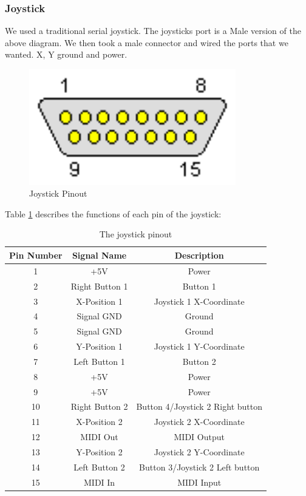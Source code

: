 \subsubsection{Joystick}
We used a traditional serial joystick. The joysticks port is a Male version of the above diagram. We then took a male connector and wired the ports that we wanted. X, Y ground and power. 

\begin{figure}[h]
  \begin{center}
    \includegraphics[width=90mm]{imageSources/joystick.png}
  \end{center}
  \caption{Joystick Pinout} 
  \label{joystick}
\end{figure}

Table \ref{joystickPinout} describes the functions of each pin of the joystick:
\begin{table}
\caption{The joystick pinout}
\begin{center}
\begin{tabular}{ c c c } 
  Pin Number & Signal Name & Description \\
  \hline
 1 & +5V & Power \\
 2 & Right Button 1 & Button 1 \\
 3 & X-Position 1 & Joystick 1 X-Coordinate \\
 4 & Signal GND & Ground \\
 5 & Signal GND & Ground \\
 6 & Y-Position 1 & Joystick 1 Y-Coordinate \\
 7 & Left Button 1 & Button 2 \\
 8 & +5V & Power \\
 9 & +5V & Power \\
 10 & Right Button 2 & Button 4/Joystick 2 Right button \\
 11 & X-Position 2 & Joystick 2 X-Coordinate \\
 12 & MIDI Out & MIDI Output \\
 13 & Y-Position 2 & Joystick 2 Y-Coordinate \\
 14 & Left Button 2 & Button 3/Joystick 2 Left button \\
 15 & MIDI In & MIDI Input \\
\end{tabular}
\label{joystickPinout}
\end{center}
\end{table}

